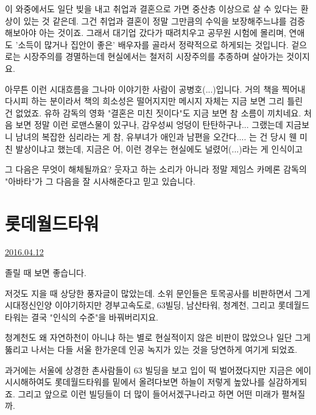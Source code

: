 이 와중에서도 일단 빚을 내고 취업과 결혼으로 가면 중산층 이상으로 살 수 있다는 환상이 있는 것 같은데.
그건 취업과 결혼이 정말 그만큼의 수익을 보장해주느냐를 검증해보아야 아는 것이죠.
그래서 대기업 갔다가 때려치우고 공무원 시험에 몰리며, 연애도 '소득이 많거나 집안이 좋은' 배우자를 골라서 정략적으로 하게되는 것입니다.
겉으로는 시장주의를 경멸하는데 현실에서는 철저히 시장주의를 추종하며 살아가는 것이지요.
\vspace{5mm}

아무튼 이런 시대흐름을 그나마 이야기한 사람이 공병호(...)입니다.
거의 책을 찍어내다시피 하는 분이라서 책의 희소성은 떨어지지만 메시지 자체는 지금 보면 그리 틀린 건 없었죠.
유하 감독의 영화 "결혼은 미친 짓이다"도 지금 보면 참 소름이 끼치네요.
처음 보면 정말 이런 로맨스물이 있구나, 감우성씨 엉덩이 탄탄하구나... 그랬는데 지금보니 남녀의 복잡한 심리라는 게 참,
유부녀가 애인과 남편을 오간다.... 는 건 당시 웬 미친 발상이냐고 했는데, 지금은 어, 이런 경우는 현실에도 널렸어(...)라는 게 인식이고
\vspace{5mm}

그 다음은 무엇이 해체될까요?
웃자고 하는 소리가 아니라 정말 제임스 카메론 감독의 "아바타"가 그 다음을 잘 시사해준다고 믿고 있습니다.
\vspace{5mm}






\section{롯데월드타워}
\href{https://www.kockoc.com/Apoc/724878}{2016.04.12}

\vspace{5mm}

졸릴 때 보면 좋습니다.
\vspace{5mm}

저것도 지을 때 상당한 풍자글이 많았는데.
소위 문인들은 토목공사를 비판하면서 그게 시대정신인양 이야기하지만
경부고속도로, 63빌딩, 남산타워, 청계천, 그리고 롯데월드타워는 결국 "인식의 수준"을 바꿔버리지요.
\vspace{5mm}

청계천도 왜 자연하천이 아니냐 하는 별로 현실적이지 않은 비판이 많았으나
일단 그게 뚫리고 나서는 다들 서울 한가운데 인공 녹지가 있는 것을 당연하게 여기게 되었죠.
\vspace{5mm}

과거에는 서울에 상경한 촌사람들이 63 빌딩을 보고 입이 떡 벌어졌다지만 지금은 에이 시시해하여도
롯데월드타워를 밑에서 올려다보면 하늘이 저렇게 높았나를 실감하게되죠.
그리고 앞으로 이런 빌딩들이 더 많이 들어서겠구나라고 하면 어떤 미래가 펼쳐질까.
\vspace{5mm}

